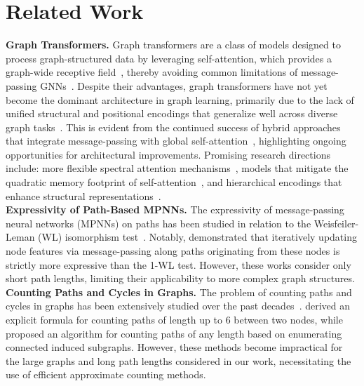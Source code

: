 \section{Related Work}
\label{sec:rw}
\textbf{Graph Transformers.} Graph transformers are a class of models designed to process graph-structured data by leveraging self-attention, which provides a graph-wide receptive field~\citep{vaswani2017attention,ying2021transformers}, thereby avoiding common limitations of message-passing GNNs~\citep{topping2022understanding}. Despite their advantages, graph transformers have not yet become the dominant architecture in graph learning, primarily due to the lack of unified structural and positional encodings that generalize well across diverse graph tasks~\citep{rampavsek2022recipe}. This is evident from the continued success of hybrid approaches that integrate message-passing with global self-attention~\citep{wu2021representing,rampavsek2022recipe,he2023generalization,choi2024topology}, highlighting ongoing opportunities for architectural improvements. Promising research directions include: more flexible spectral attention mechanisms~\citep{bo2023specformer}, models that mitigate the quadratic memory footprint of self-attention~\citep{shirzad2023exphormer}, and hierarchical encodings that enhance structural representations~\citep{luo2024enhancing}. \\
\textbf{Expressivity of Path-Based MPNNs.} The expressivity of message-passing neural networks (MPNNs) on paths has been studied in relation to the Weisfeiler-Leman (WL) isomorphism test~\citep{michel2023path,graziani2023no}. Notably, \citet{graziani2023no} demonstrated that iteratively updating node features via message-passing along paths originating from these nodes is strictly more expressive than the 1-WL test. However, these works consider only short path lengths, limiting their applicability to more complex graph structures. \\
\textbf{Counting Paths and Cycles in Graphs.} The problem of counting paths and cycles in graphs has been extensively studied over the past decades~\citep{johnson1975finding,alon1997finding,flum2004parameterized}. \citet{perepechko2009number} derived an explicit formula for counting paths of length up to 6 between two nodes, while \citet{giscard2019general} proposed an algorithm for counting paths of any length based on enumerating connected induced subgraphs. However, these methods become impractical for the large graphs and long path lengths considered in our work, necessitating the use of efficient approximate counting methods.